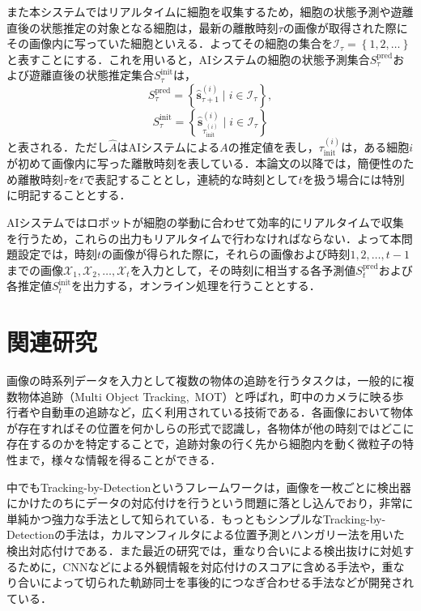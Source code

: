 また本システムではリアルタイムに細胞を収集するため，細胞の状態予測や遊離直後の状態推定の対象となる細胞は，最新の離散時刻$\tau$の画像が取得された際にその画像内に写っていた細胞といえる．よってその細胞の集合を$\mathcal{I}_\tau = \left\{1, 2, \dots\right\}$と表すことにする．これを用いると，AIシステムの細胞の状態予測集合$S^{\text{pred}}_{\tau}$および遊離直後の状態推定集合$S^{\text{init}}_{\tau}$は，
\begin{equation}
    \label{eq:cell_state_prediction}
    S^{\text{pred}}_{\tau} = \left\{\hat{\bm{s}}_{\tau + 1}^{(i)} \mid i \in \mathcal{I}_{\tau}\right\},
\end{equation}
\begin{equation}
    \label{eq:cell_initial_state_prediction}
    S^{\text{init}}_{\tau} = \left\{\hat{\bm{s}}_{\tau_{\text{init}}^{(i)}}^{(i)} \mid i \in \mathcal{I}_{\tau}\right\}
\end{equation}
と表される．ただし$\hat{A}$はAIシステムによる$A$の推定値を表し，$\tau_{\text{init}}^{(i)}$は，ある細胞$i$が初めて画像内に写った離散時刻を表している．本論文の以降では，簡便性のため離散時刻$\tau$を$t$で表記することとし，連続的な時刻として$t$を扱う場合には特別に明記することとする．

AIシステムではロボットが細胞の挙動に合わせて効率的にリアルタイムで収集を行うため，これらの出力もリアルタイムで行わなければならない．よって本問題設定では，時刻$t$の画像が得られた際に，それらの画像および時刻$1,2,\dots, t-1$までの画像$\mathcal{X}_1, \mathcal{X}_2, \dots, \mathcal{X}_t$を入力として，その時刻に相当する各予測値$S_t^{\text{pred}}$および各推定値$S_t^{\text{init}}$を出力する，オンライン処理を行うこととする．

\section{関連研究}
\label{sec:related_works}

画像の時系列データを入力として複数の物体の追跡を行うタスクは，一般的に複数物体追跡（Multi Object Tracking,\ MOT）\cite{luo2021multiple}と呼ばれ，町中のカメラに映る歩行者や自動車の追跡など，広く利用されている技術である\cite{milan2016mot16,dendorfer2020mot20}．各画像において物体が存在すればその位置を何かしらの形式で認識し，各物体が他の時刻ではどこに存在するのかを特定することで，追跡対象の行く先から細胞内を動く微粒子の特性まで，様々な情報を得ることができる．

中でもTracking-by-Detectionというフレームワークは，画像を一枚ごとに検出器にかけたのちにデータの対応付けを行うという問題に落とし込んでおり，非常に単純かつ強力な手法として知られている．もっともシンプルなTracking-by-Detectionの手法は，カルマンフィルタによる位置予測とハンガリー法を用いた検出対応付けである．また最近の研究では，重なり合いによる検出抜けに対処するために，CNN\cite{Goodfellow-et-al-2016,lecun1998gradient}などによる外観情報を対応付けのスコアに含める手法\cite{wojke2017simple,du2023strongsort}や，重なり合いによって切られた軌跡同士を事後的につなぎ合わせる手法\cite{zhang2022bytetrack}などが開発されている．

